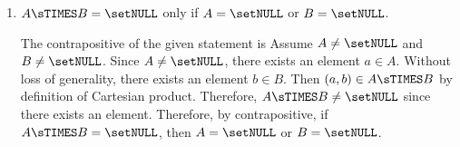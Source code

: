 \begin{enumerate}
\begin{enumerate}
    \item $A \sTIMES B = \setNULL$ only if $A = \setNULL$ or $B = \setNULL$.
    \begin{subprove}
      The contrapositive of the given statement is 
      Assume $A \neq \setNULL$ and $B \neq \setNULL$.
      Since $A \neq \setNULL$, there exists an element $a \in A$.
      Without loss of generality, there exists an element $b \in B$.
      Then $(a,b) \in A \sTIMES B$ by definition of Cartesian product.
      Therefore, $A \sTIMES B \neq \setNULL$ since there exists an element.
      Therefore, by contrapositive, if $A \sTIMES B = \setNULL$, then $A = \setNULL$ or $B = \setNULL$.
    \end{subprove}
  \end{enumerate}

\end{enumerate}